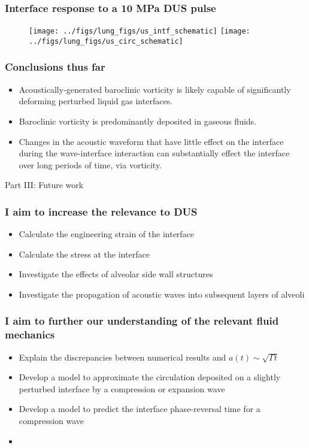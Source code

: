 \begin{frame} \frametitle{Interface response to a 10 MPa DUS pulse}
  \begin{figure}
    \centering
    \texttt{[image: ../figs/lung\_figs/us\_intf\_schematic]} \hfill
    \texttt{[image: ../figs/lung\_figs/us\_circ\_schematic]}
  \end{figure}
\end{frame}
\begin{frame} \frametitle{Conclusions thus far}
  \begin{itemize}
  \item Acoustically-generated baroclinic vorticity is likely capable
    of significantly deforming perturbed liquid gas interfaces.
  \item Baroclinic vorticity is predominantly deposited in gaseous fluids.
  \item Changes in the acoustic waveform that have little effect on
    the interface during the wave-interface interaction can
    substantially effect the interface over long periods of time, via
    vorticity.
  \end{itemize}
\end{frame}
\begin{frame}
  \centering
  \begin{center}
    \LARGE Part III: Future work
  \end{center}
\end{frame}
\begin{frame}\frametitle{I aim to increase the relevance to DUS}
  \begin{itemize}
  \item Calculate the engineering strain of the interface
  \item Calculate the stress at the interface
  \item Investigate the effects of alveolar side wall structures
  \item Investigate the propagation of acoustic waves into subsequent layers of alveoli
  \end{itemize}
\end{frame}
\begin{frame}\frametitle{I aim to further our understanding of the relevant fluid mechanics}
  \begin{itemize}
  \item Explain the discrepancies between numerical results and $a(t)\sim\sqrt{\Gamma t}$
  \item Develop a model to approximate the circulation deposited on a
    slightly perturbed interface by a compression or expansion wave
  \item Develop a model to predict the interface phase-reversal time for a compression wave
  \item 
  \end{itemize}
\end{frame}


